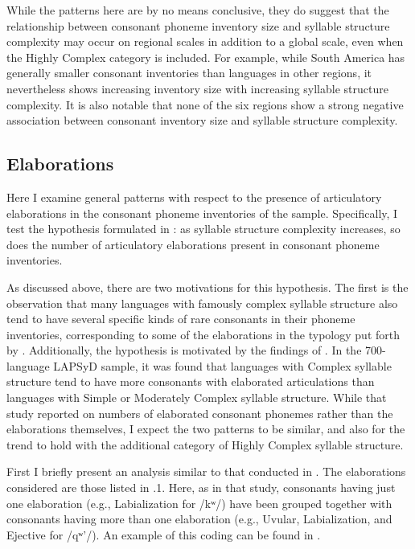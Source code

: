   While the patterns here are by no means conclusive, they do suggest that the relationship between consonant phoneme inventory size and syllable structure complexity may occur on regional scales in addition to a global scale, even when the Highly Complex category is included. For example, while South America has generally smaller consonant inventories than languages in other regions, it nevertheless shows increasing inventory size with increasing syllable structure complexity. It is also notable that none of the six regions show a strong negative association between consonant inventory size and syllable structure complexity.

\subsection{Elaborations}\label{sec:4.4.2}

  Here I examine general patterns with respect to the presence of articulatory elaborations in the consonant phoneme inventories of the sample. Specifically, I test the hypothesis formulated in : as syllable structure complexity increases, so does the number of articulatory elaborations present in consonant phoneme inventories.

  As discussed above, there are two motivations for this hypothesis. The first is the observation that many languages with famously complex syllable structure also tend to have several specific kinds of rare consonants in their phoneme inventories, corresponding to some of the elaborations in the typology put forth by \citet{LindblomMaddieson1988}. Additionally, the hypothesis is motivated by the findings of \citet{MaddiesonEtAl2013}. In the 700-language LAPSyD sample, it was found that languages with Complex syllable structure tend to have more consonants with elaborated articulations than languages with Simple or Moderately Complex syllable structure. While that study reported on numbers of elaborated consonant phonemes rather than the elaborations themselves, I expect the two patterns to be similar, and also for the trend to hold with the additional category of Highly Complex syllable structure.

  First I briefly present an analysis similar to that conducted in \citet{MaddiesonEtAl2013}. The elaborations considered are those listed in .1. Here, as in that study, consonants having just one elaboration (e.g., Labialization for /kʷ/) have been grouped together with consonants having more than one elaboration (e.g., Uvular, Labialization, and Ejective for /qʷ’/). An example of this coding can be found in .

